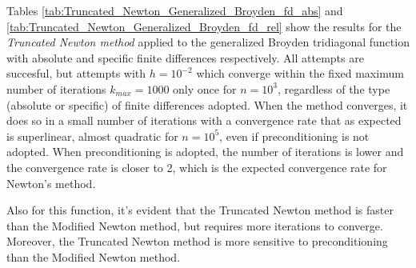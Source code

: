 Tables \ref{tab:Truncated_Newton_Generalized_Broyden_fd_abs} and \ref{tab:Truncated_Newton_Generalized_Broyden_fd_rel} show the results for the \textit{Truncated Newton method} applied to the generalized Broyden tridiagonal function with absolute and specific finite differences respectively.
All attempts are succesful, but attempts with $h=10^{-2}$ which converge within the fixed maximum number of iterations $k_{\textit{max}}=1000$ only once for $n=10^3$, regardless of the type (absolute or specific) of finite differences adopted.
When the method converges, it does so in a small number of iterations with a convergence rate that as expected is superlinear, almost quadratic for $n = 10^5$, even if preconditioning is not adopted. 
When preconditioning is adopted, the number of iterations is lower and the convergence rate is closer to 2, which is the expected convergence rate for Newton's method.

Also for this function, it's evident that the Truncated Newton method is faster than the Modified Newton method, but requires more iterations to converge.
Moreover, the Truncated Newton method is more sensitive to preconditioning than the Modified Newton method.
    
